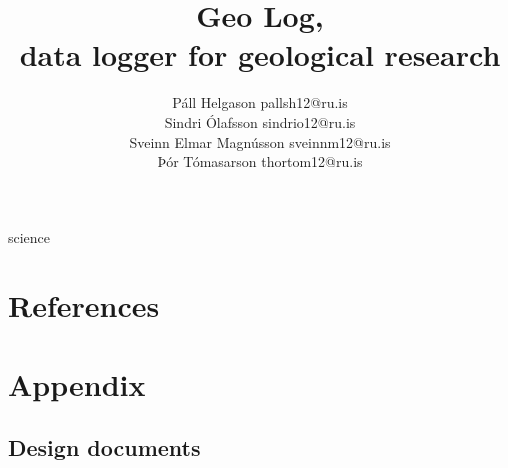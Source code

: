 \documentclass[12pt, svn, draft]{rureport}
\author{Páll Helgason pallsh12@ru.is\\Sindri Ólafsson sindrio12@ru.is\\Sveinn Elmar Magnússon sveinnm12@ru.is\\Þór Tómasarson thortom12@ru.is}  %
\title{Geo Log,\\ \large{data logger for geological research}}  %
\begin{document}
\maketitle  %







science

\section{References}

\section{Appendix}
\subsection{Design documents}

\pagebreak


\end{document}
